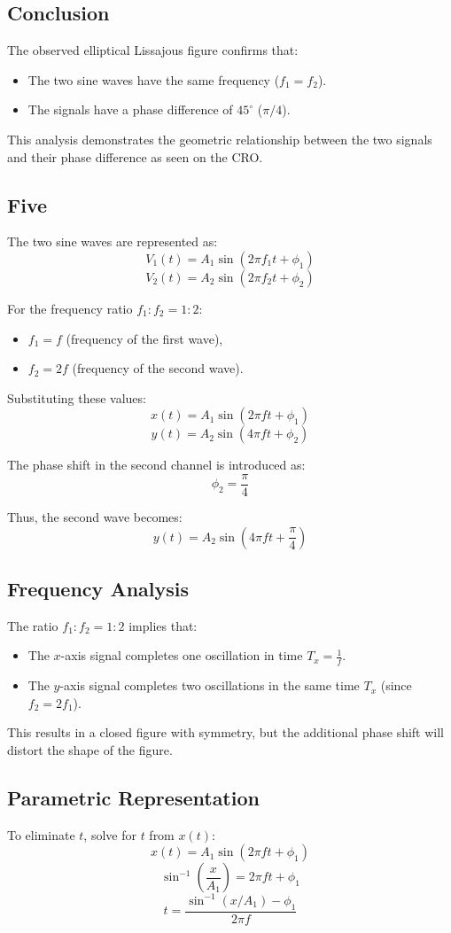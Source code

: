 \documentclass[12pt,a4paper]{report}
\begin{document}
\subsection*{Conclusion}
The observed elliptical Lissajous figure confirms that:
\begin{itemize}
    \item The two sine waves have the same frequency (\(f_1 = f_2\)).
    \item The signals have a phase difference of \(45^\circ\) (\(\pi/4\)).
\end{itemize}
This analysis demonstrates the geometric relationship between the two signals and their phase difference as seen on the CRO.
\subsection{Five}
The two sine waves are represented as:
\[
V_1(t) = A_1 \sin(2 \pi f_1 t + \phi_1)
\]
\[
V_2(t) = A_2 \sin(2 \pi f_2 t + \phi_2)
\]

For the frequency ratio $f_1 : f_2 = 1 : 2$:
\begin{itemize}
    \item $f_1 = f$ (frequency of the first wave),
    \item $f_2 = 2f$ (frequency of the second wave).
\end{itemize}
Substituting these values:
\[
x(t) = A_1 \sin(2 \pi f t + \phi_1)
\]
\[
y(t) = A_2 \sin(4 \pi f t + \phi_2)
\]

The phase shift in the second channel is introduced as:
\[
\phi_2 = \frac{\pi}{4}
\]

Thus, the second wave becomes:
\[
y(t) = A_2 \sin(4 \pi f t + \frac{\pi}{4})
\]

\subsection*{Frequency Analysis}
The ratio $f_1 : f_2 = 1 : 2$ implies that:
\begin{itemize}
    \item The $x$-axis signal completes one oscillation in time $T_x = \frac{1}{f}$.
    \item The $y$-axis signal completes two oscillations in the same time $T_x$ (since $f_2 = 2f_1$).
\end{itemize}
This results in a closed figure with symmetry, but the additional phase shift will distort the shape of the figure.

\subsection*{Parametric Representation}
To eliminate $t$, solve for $t$ from $x(t)$:
\[
x(t) = A_1 \sin(2 \pi f t + \phi_1)
\]
\[
\sin^{-1}\left(\frac{x}{A_1}\right) = 2 \pi f t + \phi_1
\]
\[
t = \frac{\sin^{-1}(x / A_1) - \phi_1}{2 \pi f}
\]
\end{document}
